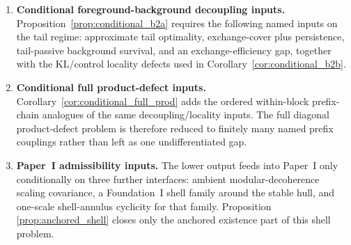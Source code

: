 \documentclass[12pt]{article}
\theoremstyle{definition}
\theoremstyle{remark}
\begin{document}
\begin{enumerate}
\item \textbf{Conditional foreground-background decoupling inputs.}
Proposition~\ref{prop:conditional_b2a} requires the following named
inputs on the tail regime: approximate tail optimality, exchange-cover
plus persistence, tail-passive background survival, and an
exchange-efficiency gap, together with the KL/control locality defects
used in Corollary~\ref{cor:conditional_b2b}.

\item \textbf{Conditional full product-defect inputs.}
Corollary~\ref{cor:conditional_full_prod} adds the ordered within-block
prefix-chain analogues of the same decoupling/locality inputs. The full
diagonal product-defect problem is therefore reduced to finitely many
named prefix couplings rather than left as one undifferentiated gap.

\item \textbf{Paper~I admissibility inputs.}
The lower output feeds into Paper~I only conditionally on three further
interfaces: ambient modular-decoherence scaling covariance, a
Foundation~I shell family around the stable hull, and one-scale
shell-annulus cyclicity for that family. Proposition~
\ref{prop:anchored_shell} closes only the anchored existence part of
this shell problem.
\end{enumerate}

\newpage
{}
\end{document}
